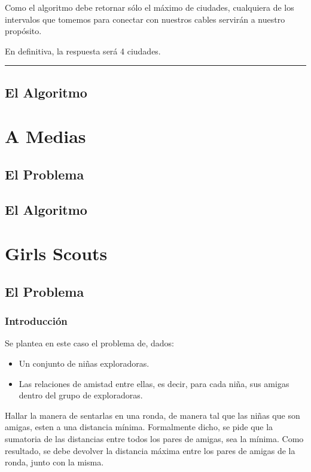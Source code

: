 \documentclass[11pt]{article}
\newcommand{\linea}{\noindent\rule{12cm}{0.4pt}}
\begin{document}
Como el algoritmo debe retornar sólo el máximo de ciudades, cualquiera de los intervalos que tomemos para conectar con nuestros cables servirán a nuestro propósito.

En definitiva, la respuesta será 4 ciudades.

\linea

\subsection{El Algoritmo}


\newpage


\section{A Medias}

\subsection{El Problema}

\subsection{El Algoritmo}



\newpage


\section{Girls Scouts}

\subsection{El Problema}
 \subsubsection{Introducción}
Se plantea en este caso el problema de, dados:
\begin{itemize}

\item Un conjunto de niñas exploradoras.

\item Las relaciones de amistad entre ellas, es decir, para cada niña, sus amigas dentro del grupo de exploradoras.
\end{itemize}

Hallar la manera de sentarlas en una ronda, de manera tal que las niñas que son amigas, esten a una distancia mínima. Formalmente dicho, se pide que la sumatoria de las distancias entre todos los pares de amigas, sea la mínima. Como resultado, se debe devolver la distancia máxima entre los pares de amigas de la ronda, junto con la misma. 
\end{document}

